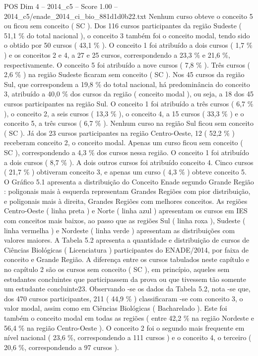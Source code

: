\begin{textsample}{POS Dim 4 – 2014\_c5 – Score 1.00 – 2014\_c5/enade\_2014\_ci\_bio\_881d1d0b22.txt}
Nenhum curso obteve o conceito 5 ou ficou sem conceito ( SC ).
Dos 116 cursos participantes da região Sudeste ( 51,1 \% do total nacional ), o conceito 3 também foi o conceito modal, tendo sido o obtido por 50 cursos ( 43,1 \% ).
O conceito 1 foi atribuído a dois cursos ( 1,7 \% ) e os conceitos 2 e 4, a 27 e 25 cursos, correspondendo a 23,3 \% e 21,6 \%, respectivamente.
O conceito 5 foi atribuído a nove cursos ( 7,8 \% ).
Três cursos ( 2,6 \% ) na região Sudeste ficaram sem conceito ( SC ).
Nos 45 cursos da região Sul, que correspondem a 19,8 \% do total nacional, há predominância do conceito 3, atribuído a 40,0 \% dos cursos da região ( conceito modal ), ou seja, a 18 dos 45 cursos participantes na região Sul.
O conceito 1 foi atribuído a três cursos ( 6,7 \% ), o conceito 2, a seis cursos ( 13,3 \% ), o conceito 4, a 15 cursos ( 33,3 \% ) e o conceito 5, a três cursos ( 6,7 \% ).
Nenhum curso na região Sul ficou sem conceito ( SC ).
Já dos 23 cursos participantes na região Centro-Oeste, 12 ( 52,2 \% ) receberam conceito 2, o conceito modal.
Apenas um curso ficou sem conceito ( SC ), correspondendo a 4,3 \% dos cursos nessa região.
O conceito 1 foi atribuído a dois cursos ( 8,7 \% ).
A dois outros cursos foi atribuído conceito 4.
Cinco cursos ( 21,7 \% ) obtiveram conceito 3, e apenas um curso ( 4,3 \% ) obteve conceito 5.
O Gráfico 5.1 apresenta a distribuição do Conceito Enade segundo Grande Região : poligonais mais à esquerda representam Grandes Regiões com pior distribuição, e poligonais mais à direita, Grandes Regiões com melhores conceitos.
As regiões Centro-Oeste ( linha preta ) e Norte ( linha azul ) apresentam os cursos em IES com conceitos mais baixos, ao passo que as regiões Sul ( linha roxa ), Sudeste ( linha vermelha ) e Nordeste ( linha verde ) apresentam as distribuições com valores maiores.
A Tabela 5.2 apresenta a quantidade e distribuição de cursos de Ciências Biológicas ( Licenciatura ) participantes do ENADE/2014, por faixa de conceito e Grande Região.
A diferença entre os cursos tabulados neste capítulo e no capítulo 2 são os cursos sem conceito ( SC ), em princípio, aqueles sem estudantes concluintes que participassem da prova ou que tivessem tão somente um estudante concluinte23.
Observando -se os dados da Tabela 5.2, nota -se que, dos 470 cursos participantes, 211 ( 44,9 \% ) classificaram -se com conceito 3, o valor modal, assim como em Ciências Biológicas ( Bacharelado ).
Este foi também o conceito modal em todas as regiões ( entre 42,2 \% na região Nordeste e 56,4 \% na região Centro-Oeste ).
O conceito 2 foi o segundo mais frequente em nível nacional ( 23,6 \%, correspondendo a 111 cursos ) e o conceito 4, o terceiro ( 20,6 \%, correspondendo a 97 cursos ).

\end{textsample}
